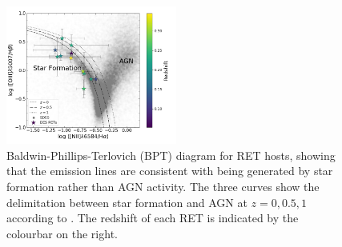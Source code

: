 \documentclass[fleqn,usenatbib,]{mnras}
\begin{document}
\begin{figure}
\includegraphics[width=0.5\textwidth]{figs/RET_BPT.png}
\caption{Baldwin-Phillips-Terlovich (BPT) diagram for RET hosts, showing that the emission lines are consistent with being generated by star formation rather than AGN activity. The three curves show the delimitation between star formation and AGN at $z =0, 0.5, 1$ according to \citet{Kewley2013}. The redshift of each RET is indicated by the colourbar on the right.
\label{fig:bpt}}
\end{figure}
\end{document}

